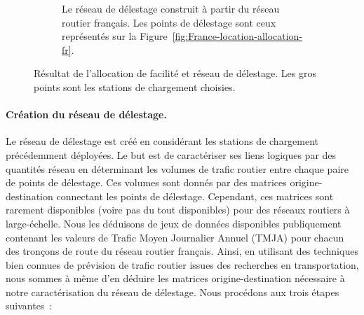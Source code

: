 \begin{figure}[ht]
\begin{subfigure}[t]{0.5\columnwidth}
            \caption{Le réseau de délestage construit à partir du réseau routier français. Les points de délestage sont ceux représentés sur la Figure~\ref{fig:France-location-allocation-fr}.} 
            \label{fig:France-overlay-wo-capacity-fr} 
    \end{subfigure} 
    \caption{Résultat de l’allocation de facilité et réseau de délestage. Les gros points sont les stations de chargement choisies.} 
\end{figure} 
 
 
 
 
\paragraph{Création du réseau de délestage.} 
Le réseau de délestage est créé en considérant les stations de chargement précédemment déployées. Le but est de caractériser ses liens logiques par des quantités réseau en déterminant les volumes de trafic routier entre chaque paire de points de délestage. Ces volumes sont donnés par des matrices origine-destination connectant les points de délestage. Cependant, ces matrices sont rarement disponibles (voire pas du tout disponibles) pour des réseaux routiers à large-échelle. Nous les déduisons de jeux de données disponibles publiquement contenant les valeurs de Trafic Moyen Journalier Annuel (TMJA) pour chacun des tronçons de route du réseau routier français. Ainsi, en utilisant des techniques bien connues de prévision de trafic routier issues des recherches en transportation, nous sommes à même d’en déduire les matrices origine-destination nécessaire à notre caractérisation du réseau de délestage. Nous procédons aux trois étapes suivantes~: 
 
